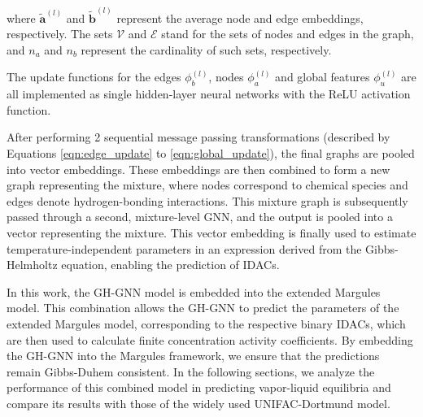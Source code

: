 \noindent where $\widetilde{\mathbf{a}}^{(l)}$ and $\widetilde{\mathbf{b}}^{(l)}$ represent the average node and edge embeddings, respectively. The sets $\mathcal{V}$ and $\mathcal{E}$ stand for the sets of nodes and edges in the graph, and $n_a$ and $n_b$ represent the cardinality of such sets, respectively.

The update functions for the edges $\phi_b^{(l)}$, nodes $\phi_a^{(l)}$ and global features $\phi_u^{(l)}$ are all implemented as single hidden-layer neural networks with the ReLU activation function.

After performing 2 sequential message passing transformations (described by Equations \ref{eqn:edge_update} to \ref{eqn:global_update}), the final graphs are pooled into vector embeddings. These embeddings are then combined to form a new graph representing the mixture, where nodes correspond to chemical species and edges denote hydrogen-bonding interactions. This mixture graph is subsequently passed through a second, mixture-level GNN, and the output is pooled into a vector representing the mixture. This vector embedding is finally used to estimate temperature-independent parameters in an expression derived from the Gibbs-Helmholtz equation, enabling the prediction of IDACs.

In this work, the GH-GNN model is embedded into the extended Margules model. This combination allows the GH-GNN to predict the parameters of the extended Margules model, corresponding to the respective binary IDACs, which are then used to calculate finite concentration activity coefficients. By embedding the GH-GNN into the Margules framework, we ensure that the predictions remain Gibbs-Duhem consistent. In the following sections, we analyze the performance of this combined model in predicting vapor-liquid equilibria and compare its results with those of the widely used UNIFAC-Dortmund \cite{constantinescu2016further} model.




